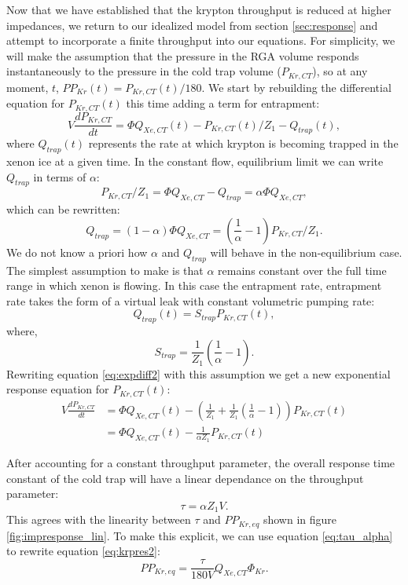\documentclass[12pt]{article}
\begin{document}
Now that we have established that the krypton throughput is reduced at higher impedances, we return to our idealized model from section \ref{sec:response} and attempt to incorporate a finite throughput into our equations. For simplicity, we will make the assumption that the pressure in the RGA volume responds instantaneously to the pressure in the cold trap volume ($P_{Kr,CT}$), so at any moment, $t$, $PP_{Kr}(t)=P_{Kr,CT}(t)/180$. We start by rebuilding the differential equation for $P_{Kr,CT}(t)$ this time adding a term for entrapment:
\begin{equation}
\label{eq:expdiff2}
V\frac{dP_{Kr,CT}}{dt}=\Phi Q_{Xe,CT}(t)-P_{Kr,CT}(t)/Z_1-Q_{trap}(t),
\end{equation}
where $Q_{trap}(t)$ represents the rate at which krypton is becoming trapped in the xenon ice at a given time. In the constant flow, equilibrium limit we can write $Q_{trap}$ in terms of $\alpha$:
\begin{equation}
P_{Kr,CT}/Z_1= \Phi Q_{Xe,CT}-Q_{trap}=\alpha \Phi Q_{Xe,CT},
\end{equation}
which can be rewritten:
\begin{equation}
Q_{trap}=(1-\alpha )\Phi Q_{Xe,CT}=(\frac{1}{\alpha}-1)P_{Kr,CT}/Z_1.
\end{equation}
We do not know a priori how $\alpha$ and $Q_{trap}$ will behave in the non-equilibrium case. The simplest assumption to make is that $\alpha$ remains constant over the full time range in which xenon is flowing. In this case the entrapment rate, entrapment rate takes the form of a virtual leak with constant volumetric pumping rate: 
\begin{equation}
Q_{trap}(t) = S_{trap}P_{Kr,CT}(t),
\end{equation}
where,
\begin{equation}
\label{eq:strap}
S_{trap}=\frac{1}{Z_1}(\frac{1}{\alpha}-1).
\end{equation}
Rewriting equation \ref{eq:expdiff2} with this assumption we get a new exponential response equation for $P_{Kr,CT}(t)$:
\begin{align}
 \label{eq:expdiff3}
V\frac{dP_{Kr,CT}}{dt}&=\Phi Q_{Xe,CT}(t)-(\frac{1}{Z_1}+\frac{1}{Z_1}(\frac{1}{\alpha}-1))P_{Kr,CT}(t)\\
&=\Phi Q_{Xe,CT}(t)-\frac{1}{\alpha Z_1}P_{Kr,CT}(t)
\end{align}

After accounting for a constant throughput parameter, the overall response time constant of the cold trap will have a linear dependance on the throughput parameter:
\begin{equation}
\label{eq:tau_alpha}
\tau=\alpha Z_1 V.
\end{equation}
This agrees with the linearity between $\tau$ and $PP_{Kr,eq}$ shown in figure \ref{fig:impresponse_lin}. To make this explicit, we can use equation \ref{eq:tau_alpha} to rewrite equation \ref{eq:krpres2}:
\begin{equation}
\label{eq:krpres3}
PP_{Kr,eq}=\frac{\tau}{180V}Q_{Xe,CT}\Phi_{Kr}.
\end{equation}
\end{document}
